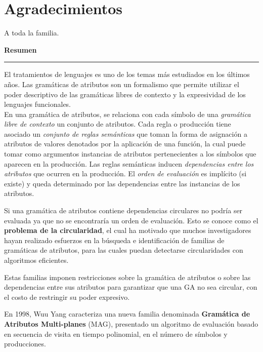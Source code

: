 \documentclass[a4paper,12pt,twoside]{ThesisStyle}
\begin{document}


\dominitoc


\cleardoublepage

\section*{Agradecimientos}

A toda la familia.

\cleardoublepage

\begin{vcenterpage}

{\large\textbf{Resumen\\}}
\noindent\rule[2pt]{\textwidth}{0.5pt}

El tratamientos de lenguajes es uno de los temas más estudiados en los últimos años.
Las gramáticas de atributos son un formalismo que permite utilizar el poder descriptivo de las gramáticas libres de contexto y la expresividad de los lenguajes funcionales.\\ 

En una gramática de atributos, se relaciona con cada símbolo de una \textit{gramática libre de contexto} un conjunto de atributos. Cada regla o producción tiene asociado un \textit{conjunto de reglas semánticas} que toman la forma de asignación a atributos de valores denotados por la aplicación de una función, la cual puede tomar como argumentos instancias de atributos pertenecientes a los símbolos que aparecen en la producción.
Las reglas semánticas inducen \textit{dependencias entre los atributos} que ocurren en la producción. El \textit{orden de evaluación} es implícito (si existe) y queda determinado por las dependencias entre las instancias de los atributos.

Si una gramática de atributos contiene dependencias circulares no podría ser evaluada ya que no se encontraría un orden de evaluación. Esto se conoce como el \textbf{problema de la circularidad}, el cual ha motivado que muchos investigadores hayan realizado esfuerzos en la búsqueda e identificación de familias de gramáticas de atributos, para las cuales puedan detectarse circularidades con algoritmos eficientes.

Estas familias imponen restricciones sobre la gramática de atributos o sobre las dependencias entre sus atributos para garantizar que una GA no sea circular, con el costo de restringir su poder expresivo.

En 1998, Wuu Yang caracteriza una nueva familia denominada \textbf{Gramática de Atributos Multi-planes} (MAG), presentado un algoritmo de evaluación basado en secuencia de visita en tiempo polinomial, en el número de símbolos y producciones.\\ 



\end{vcenterpage}
\end{document}
